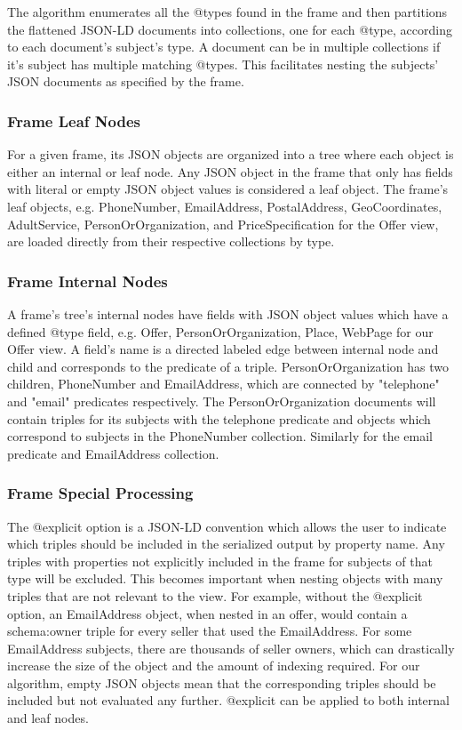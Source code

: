 The algorithm enumerates all the @types found in the frame and then partitions the flattened JSON-LD documents into collections, one for each @type, according to each document's subject's type.
A document can be in multiple collections if it's subject has multiple matching @types.  
This facilitates nesting the subjects' JSON documents as specified by the frame.

\subsubsection{Frame Leaf Nodes}
For a given frame, its JSON objects are organized into a tree where each object is either an internal or leaf node.
Any JSON object in the frame that only has fields with literal or empty JSON object values is considered a leaf object.
The frame's leaf objects, e.g. PhoneNumber, EmailAddress, PostalAddress, GeoCoordinates, AdultService, PersonOrOrganization, and PriceSpecification for the Offer view, are loaded directly from their respective collections by type.

\subsubsection{Frame Internal Nodes}
A frame's tree's internal nodes have fields with JSON object values which have a defined @type field, e.g. Offer, PersonOrOrganization, Place, WebPage for our Offer view.
A field's name is a directed labeled edge between internal node and child and corresponds to the predicate of a triple.
PersonOrOrganization has two children, PhoneNumber and EmailAddress, which are connected by "telephone" and "email" predicates respectively.
The PersonOrOrganization documents will contain triples for its subjects with the telephone predicate and objects which correspond to subjects in the PhoneNumber collection.
Similarly for the email predicate and EmailAddress collection.

\subsubsection{Frame Special Processing}
The @explicit option is a JSON-LD convention which allows the user to indicate which triples should be included in the serialized output by property name.
Any triples with properties not explicitly included in the frame for subjects of that type will be excluded.
This becomes important when nesting objects with many triples that are not relevant to the view.  
For example, without the @explicit option, an EmailAddress object, when nested in an offer, would contain a schema:owner triple for every seller that used the EmailAddress.
For some EmailAddress subjects, there are thousands of seller owners, which can drastically increase the size of the object and the amount of indexing required.
For our algorithm, empty JSON objects mean that the corresponding triples should be included but not evaluated any further.
@explicit can be applied to both internal and leaf nodes.

